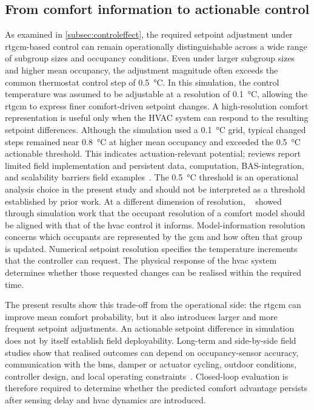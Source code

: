 \subsection{From comfort information to actionable control}
As examined in \autoref{subsec:controleffect}, the required setpoint adjustment under \ac{rtgcm}-based control can remain operationally distinguishable across a wide range of subgroup sizes and occupancy conditions.
Even under larger subgroup sizes and higher mean occupancy, the adjustment magnitude often exceeds the common thermostat control step of \qty{0.5}{\celsius}.
In this simulation, the control temperature was assumed to be adjustable at a resolution of \qty{0.1}{\celsius}, allowing the \ac{rtgcm} to express finer comfort-driven setpoint changes.
A high-resolution comfort representation is useful only when the HVAC system can respond to the resulting setpoint differences.
Although the simulation used a \qty{0.1}{\celsius} grid, typical changed steps remained near \qty{0.8}{\celsius} at higher mean occupancy and exceeded the \qty{0.5}{\celsius} actionable threshold.
This indicates actuation-relevant potential; reviews report limited field implementation and persistent data, computation, BAS-integration, and scalability barriers field examples~\cite{xie_review_2020}\cite{soleimanijavid_challenges_2024}.
The \qty{0.5}{\celsius} threshold is an operational analysis choice in the present study and should not be interpreted as a threshold established by prior work.
At a different dimension of resolution, ~\cite{ono_effects_2022} showed through simulation work that the occupant resolution of a comfort model should be aligned with that of the \ac{hvac} control it informs.
Model-information resolution concerns which occupants are represented by the \ac{gcm} and how often that group is updated.
Numerical setpoint resolution specifies the temperature increments that the controller can request.
The physical response of the \ac{hvac} system determines whether those requested changes can be realised within the required time.

The present results show this trade-off from the operational side: the \ac{rtgcm} can improve mean comfort probability, but it also introduces larger and more frequent setpoint adjustments.
An actionable setpoint difference in simulation does not by itself establish field deployability. 
Long-term and side-by-side field studies show that realised outcomes can depend on occupancy-sensor accuracy, communication with the \ac{bms}, damper or actuator cycling, outdoor conditions, controller design, and local operating constraints~\cite{jiang_occupied_2023}\cite{kong_hvac_2022}\cite{zhang_impact_2023}.
Closed-loop evaluation is therefore required to determine whether the predicted comfort advantage persists after sensing delay and \ac{hvac} dynamics are introduced.

